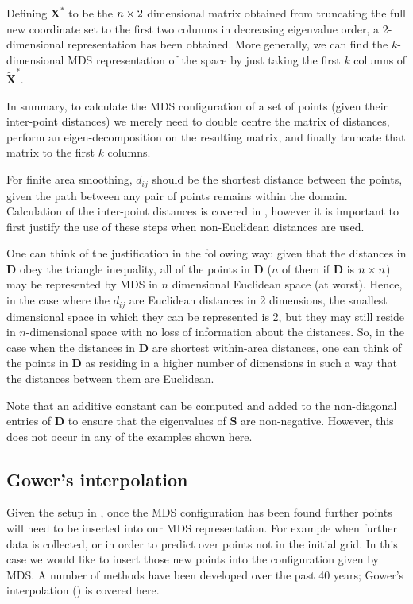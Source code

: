 Defining $\mathbf{X}^*$ to be the $n \times 2$ dimensional matrix obtained from truncating the full new coordinate set to the first two columns in decreasing eigenvalue order, a 2-dimensional representation has been obtained. More generally, we can find the $k$-dimensional MDS representation of the space by just taking the first $k$ columns of $\tilde{\mathbf{X}}^*$.

In summary, to calculate the MDS configuration of a set of points (given their inter-point distances) we merely need to double centre the matrix of distances, perform an eigen-decomposition on the resulting matrix, and finally truncate that matrix to the first $k$ columns.

For finite area smoothing, $d_{ij}$ should be the shortest distance between the points, given the path between any pair of points remains within the domain. Calculation of the inter-point distances is covered in , however it is important to first justify the use of these steps when non-Euclidean distances are used. 

One can think of the justification in the following way: given that the distances in $\mathbf{D}$ obey the triangle inequality, all of the points in $\mathbf{D}$ ($n$ of them if $\mathbf{D}$ is $n \times n$) may be represented by MDS in $n$ dimensional Euclidean space (at worst). Hence, in the case where the $d_{ij}$ are Euclidean distances in 2 dimensions, the smallest dimensional space in which they can be represented is 2, but they may still reside in $n$-dimensional space with no loss of information about the distances. So, in the case when the distances in $\mathbf{D}$ are shortest within-area distances, one can think of the points in $\mathbf{D}$ as residing in a higher number of dimensions in such a way that the distances between them are Euclidean.

Note that an additive constant can be computed and added to the non-diagonal entries of $\mathbf{D}$ to ensure that the eigenvalues of $\mathbf{S}$ are non-negative. However, this does not occur in any of the examples shown here.

\subsection{Gower's interpolation} 
\label{gowers}
Given the setup in , once the MDS configuration has been found further points will need to be inserted into our MDS representation. For example when further data is collected, or in order to predict over points not in the initial grid. In this case we would like to insert those new points into the configuration given by MDS. A number of methods have been developed over the past 40 years; Gower's interpolation (\cite{gower1968}) is covered here.

